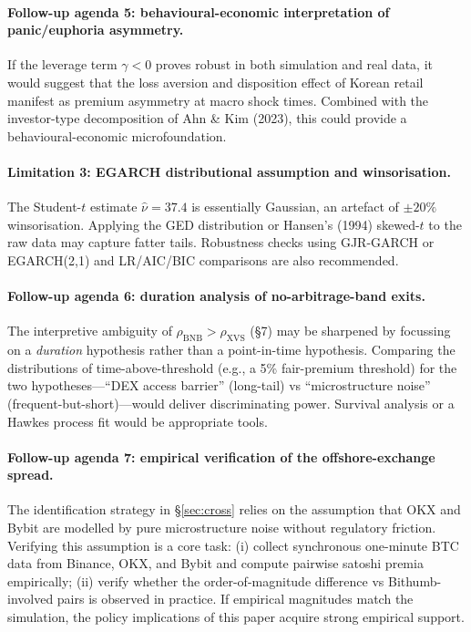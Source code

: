 \documentclass[11pt,a4paper]{article}
\begin{document}
\paragraph{Follow-up agenda 5: behavioural-economic interpretation of panic/euphoria asymmetry.}
If the leverage term $\gamma<0$ proves robust in both simulation and real data, it would suggest
that the loss aversion and disposition effect of Korean retail manifest as premium asymmetry at
macro shock times. Combined with the investor-type decomposition of Ahn \& Kim (2023), this could
provide a behavioural-economic microfoundation.

\paragraph{Limitation 3: EGARCH distributional assumption and winsorisation.}
The Student-$t$ estimate $\hat\nu=37.4$ is essentially Gaussian, an artefact of $\pm 20\%$
winsorisation. Applying the GED distribution or Hansen's (1994) skewed-$t$ to the raw data may
capture fatter tails. Robustness checks using GJR-GARCH or EGARCH(2,1) and LR/AIC/BIC comparisons
are also recommended.

\paragraph{Follow-up agenda 6: duration analysis of no-arbitrage-band exits.}
The interpretive ambiguity of $\rho_{\text{BNB}}>\rho_{\text{XVS}}$ (\S 7) may be sharpened by
focussing on a \emph{duration} hypothesis rather than a point-in-time hypothesis. Comparing
the distributions of time-above-threshold (e.g., a 5\% fair-premium threshold) for the two
hypotheses---``DEX access barrier'' (long-tail) vs ``microstructure noise''
(frequent-but-short)---would deliver discriminating power. Survival analysis or a Hawkes process
fit would be appropriate tools.

\paragraph{Follow-up agenda 7: empirical verification of the offshore-exchange spread.}
The identification strategy in \S\ref{sec:cross} relies on the assumption that OKX and Bybit are
modelled by pure microstructure noise without regulatory friction. Verifying this assumption is a
core task: (i) collect synchronous one-minute BTC data from Binance, OKX, and Bybit and compute
pairwise satoshi premia empirically; (ii) verify whether the order-of-magnitude difference vs
Bithumb-involved pairs is observed in practice. If empirical magnitudes match the simulation, the
policy implications of this paper acquire strong empirical support.
\end{document}
